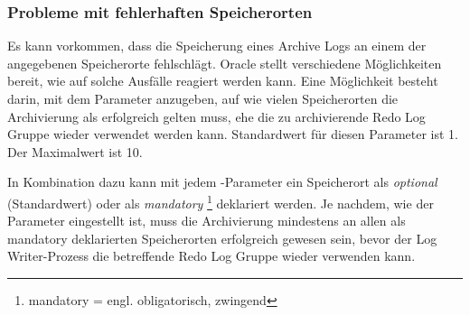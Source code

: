         \subsubsection{Probleme mit fehlerhaften Speicherorten}
          Es kann vorkommen, dass die Speicherung eines Archive Logs an einem der angegebenen Speicherorte fehlschl\"agt. Oracle stellt verschiedene M\"oglichkeiten bereit, wie auf solche Ausf\"alle reagiert werden kann. Eine M\"oglichkeit besteht darin, mit dem Parameter  anzugeben, auf wie vielen Speicherorten die Archivierung als erfolgreich gelten muss, ehe die zu archivierende Redo Log Gruppe wieder verwendet werden kann. Standardwert f\"ur diesen Parameter ist 1. Der Maximalwert ist 10.

          In Kombination dazu kann mit jedem -Parameter ein Speicherort als \textit{optional} (Standardwert) oder als \textit{mandatory} \footnote{mandatory = engl. obligatorisch, zwingend} deklariert werden. Je nachdem, wie der Parameter  eingestellt ist, muss die Archivierung mindestens an allen als mandatory deklarierten Speicherorten erfolgreich gewesen sein, bevor der Log Writer-Prozess die betreffende Redo Log Gruppe wieder verwenden kann.

